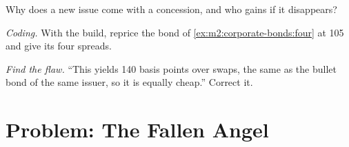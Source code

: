 \begin{exercise}[$\star\star$]\label{exo:m2:corporate-bonds:6}
Why does a new issue come with a concession, and who gains if it disappears?
\end{exercise}

\begin{exercise}[$\star\star\star$]\label{exo:m2:corporate-bonds:7}
\emph{Coding.} With the build, reprice the bond of \cref{ex:m2:corporate-bonds:four}
at 105 and give its four spreads.
\end{exercise}

\begin{exercise}[$\star\star\star$]\label{exo:m2:corporate-bonds:8}
\emph{Find the flaw.} ``This  yields 140 basis points over swaps, the
same as the bullet bond of the same issuer, so it is equally cheap.'' Correct it.
\end{exercise}

\section{Problem: The Fallen Angel}

